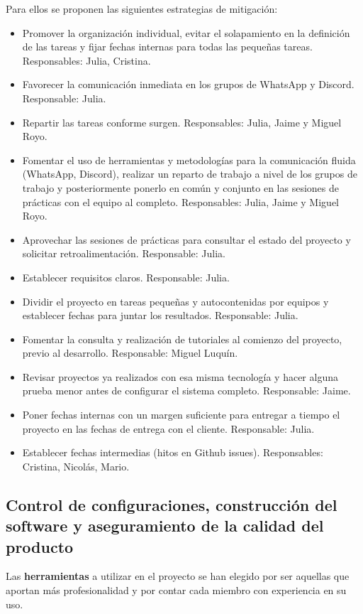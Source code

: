 \documentclass[11pt]{article}
\begin{document}
Para ellos se proponen las siguientes estrategias de mitigación:
\begin{itemize}
		\item[Ri1] Promover la organización individual, evitar el solapamiento en la definición de las tareas y fijar fechas internas para todas las pequeñas tareas. Responsables: Julia, Cristina.
		\item[Ri2] Favorecer la comunicación inmediata en los grupos de WhatsApp y Discord. Responsable: Julia.
		\item[Ri3] Repartir las tareas conforme surgen. Responsables: Julia, Jaime y Miguel Royo.
		\item[Ri4] Fomentar el uso de herramientas y metodologías para la comunicación fluida (WhatsApp, Discord), realizar un reparto de trabajo a nivel
				de los grupos de trabajo y posteriormente ponerlo en común y
				conjunto en las sesiones de prácticas con el equipo al completo. Responsables: Julia, Jaime y Miguel Royo.
		\item[Ri5] Aprovechar las sesiones de prácticas para consultar el estado del proyecto y solicitar retroalimentación. Responsable: Julia.
		\item[Ri6] Establecer requisitos claros. Responsable: Julia.
		\item[Ri7] Dividir el proyecto en tareas pequeñas y autocontenidas por equipos y establecer fechas para juntar los resultados. Responsable: Julia.
		\item[Ri8] Fomentar la consulta y realización de tutoriales al
				comienzo del proyecto, previo al desarrollo.
				Responsable: Miguel Luquín.
		\item[Ri9] Revisar proyectos ya realizados con esa misma tecnología y
				hacer alguna prueba menor antes de configurar el sistema
				completo. Responsable: Jaime.
		\item[Ri10]Poner fechas internas con un margen suficiente para entregar a tiempo el proyecto en las fechas de entrega con el cliente. 
				Responsable: Julia.
		\item[Ri11]Establecer fechas intermedias (hitos en Github issues).
				Responsables: Cristina, Nicolás, Mario.
\end{itemize}

\subsection{Control de configuraciones, construcción del software y aseguramiento de la calidad del producto}
\label{ss:deploy}
Las \textbf{herramientas} a utilizar en el proyecto se han elegido por ser
aquellas que aportan más profesionalidad y por contar cada miembro con
experiencia en su uso.
\end{document}
